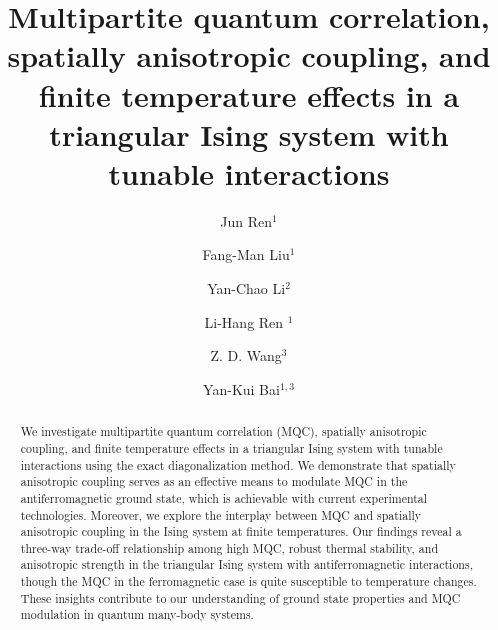 \documentclass[pra,aps,twocolumn,showpacs]{revtex4}
\begin{document}
\title{Multipartite quantum correlation, spatially anisotropic coupling, and finite temperature effects in a triangular Ising system with tunable interactions}

\author{Jun Ren$^1$}
\author{Fang-Man Liu$^1$}
\author{Yan-Chao Li$^2$}
\author{Li-Hang Ren $^1$}
\author{Z. D. Wang$^3$}
\author{Yan-Kui Bai$^{1,3}$}


\begin{abstract}
We investigate multipartite quantum correlation (MQC), spatially anisotropic coupling, and finite temperature effects in a triangular Ising system with tunable interactions using the exact diagonalization method. We demonstrate that spatially anisotropic coupling serves as an effective means to modulate MQC in the antiferromagnetic ground state, which is achievable with current experimental technologies. Moreover, we explore the interplay between MQC and spatially anisotropic coupling in the Ising system at finite temperatures. Our findings reveal a three-way trade-off relationship among high MQC, robust thermal stability, and anisotropic strength in the triangular Ising system with antiferromagnetic interactions, though the MQC in the ferromagnetic case is quite susceptible to temperature changes. These insights contribute to our understanding of ground state properties and MQC modulation in quantum many-body systems.
\end{abstract}


\maketitle
\end{document}

